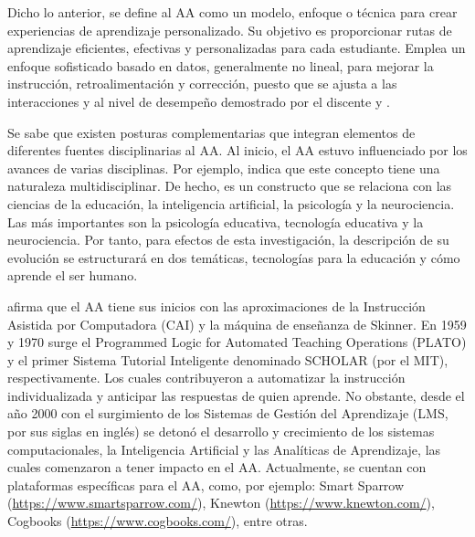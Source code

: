 \documentclass[spanish]{textolivre}
\begin{document}
Dicho lo anterior, se define al AA como un modelo, enfoque o técnica para crear experiencias de aprendizaje personalizado. Su objetivo es proporcionar rutas de aprendizaje eficientes, efectivas y personalizadas para cada estudiante. Emplea un enfoque sofisticado basado en datos, generalmente no lineal, para mejorar la instrucción, retroalimentación y corrección, puesto que se ajusta a las interacciones y al nivel de desempeño demostrado por el discente  %
y .



Se sabe que existen posturas complementarias que integran elementos de diferentes fuentes disciplinarias al AA. Al inicio, el AA estuvo influenciado por los avances de varias disciplinas. Por ejemplo, \cite{virgili2018} %
indica que este concepto tiene una naturaleza multidisciplinar. De hecho, es un constructo que se relaciona con las ciencias de la educación, la inteligencia artificial, la psicología y la neurociencia. Las más importantes son la psicología educativa, tecnología educativa y la neurociencia. Por tanto, para efectos de esta investigación, la descripción de su evolución se estructurará en dos temáticas, tecnologías para la educación y cómo aprende el ser humano.  

\textcite{picciano2019} afirma que el AA tiene sus inicios con las aproximaciones de la Instrucción Asistida por Computadora (CAI) y la máquina de enseñanza de Skinner. En 1959 y 1970 surge el Programmed Logic for Automated Teaching Operations (PLATO) y el primer Sistema Tutorial Inteligente denominado SCHOLAR (por el MIT), respectivamente. Los cuales contribuyeron a automatizar la instrucción individualizada y anticipar las respuestas de quien aprende. No obstante, desde el año 2000 con el surgimiento de los Sistemas de Gestión del Aprendizaje (LMS, por sus siglas en inglés) se detonó el desarrollo y crecimiento de los sistemas computacionales, la Inteligencia Artificial y las Analíticas de Aprendizaje, las cuales comenzaron a tener impacto en el AA. Actualmente, se cuentan con plataformas específicas para el AA, como, por ejemplo: Smart Sparrow (\url{https://www.smartsparrow.com/}), Knewton (\url{https://www.knewton.com/}), Cogbooks (\url{https://www.cogbooks.com/}), entre otras. 
\end{document}
